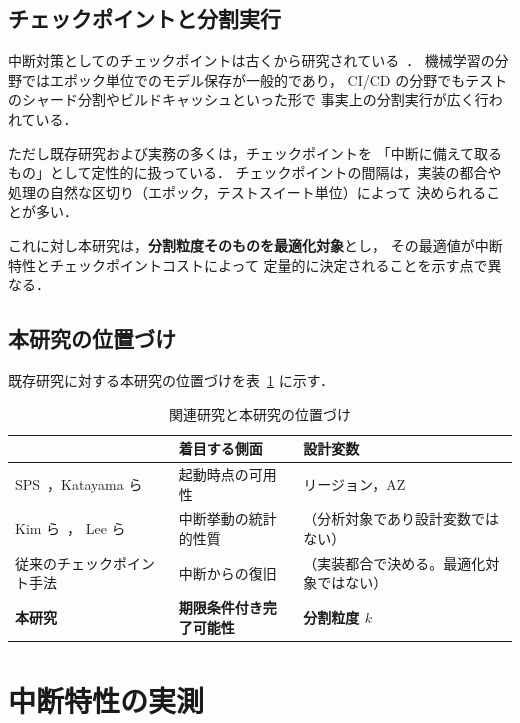 \documentclass[11pt,a4paper]{ltjsreport}
\begin{document}
\section{チェックポイントと分割実行}

中断対策としてのチェックポイントは古くから研究されている~\cite{Lin2022Survey}．
機械学習の分野ではエポック単位でのモデル保存が一般的であり，
CI/CD の分野でもテストのシャード分割やビルドキャッシュといった形で
事実上の分割実行が広く行われている．

ただし既存研究および実務の多くは，チェックポイントを
「中断に備えて取るもの」として定性的に扱っている．
チェックポイントの間隔は，実装の都合や
処理の自然な区切り（エポック，テストスイート単位）によって
決められることが多い．

これに対し本研究は，\textbf{分割粒度そのものを最適化対象}とし，
その最適値が中断特性とチェックポイントコストによって
定量的に決定されることを示す点で異なる．

\section{本研究の位置づけ}

既存研究に対する本研究の位置づけを表~\ref{tab:related} に示す．

\begin{table}[htbp]
\centering
\caption{関連研究と本研究の位置づけ}
\label{tab:related}
\small
\begin{tabularx}{\textwidth}{@{}lXX@{}}
\toprule
 & \textbf{着目する側面} & \textbf{設計変数} \\
\midrule
SPS~\cite{AWSSPS}，Katayama ら~\cite{Katayama2022}
  & 起動時点の可用性
  & リージョン，AZ \\
\addlinespace
Kim ら~\cite{Kim2024SpotInterruption}，
Lee ら~\cite{Lee2022SpotLake}
  & 中断挙動の統計的性質
  & （分析対象であり設計変数ではない） \\
\addlinespace
従来のチェックポイント手法~\cite{Lin2022Survey}
  & 中断からの復旧
  & （実装都合で決める。最適化対象ではない） \\
\addlinespace
\textbf{本研究}
  & \textbf{期限条件付き完了可能性}
  & \textbf{分割粒度 $k$} \\
\bottomrule
\end{tabularx}
\end{table}

\chapter{中断特性の実測}
\label{chap:measure}
\end{document}
